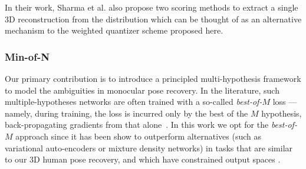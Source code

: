 In their work, Sharma et al. also propose two scoring methods to extract a single 3D reconstruction from the distribution which can be thought of as an alternative mechanism to the weighted quantizer scheme proposed here.












\subsubsection{Min-of-N}

Our primary contribution is to introduce a principled multi-hypothesis framework to model the ambiguities in monocular pose recovery.
In the literature, such multiple-hypotheses networks are often trained with a so-called \emph{best-of-$M$} loss --- namely, during training, the loss is incurred only by the best of the $M$ hypothesis, back-propagating gradients from that alone~\cite{guzman2012multiple}.
In this work we opt for the \emph{best-of-$M$} approach since it has been show to outperform  alternatives (such as variational auto-encoders or mixture density networks) in tasks that are similar to our 3D human pose recovery, and which have constrained output spaces \cite{rupprecht17learning}.



